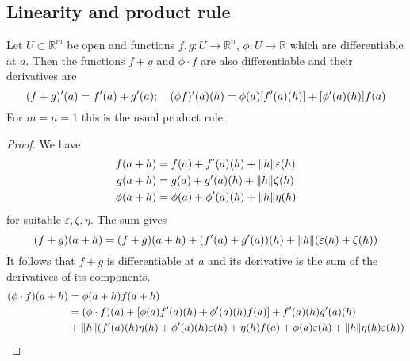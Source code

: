 \subsection{Linearity and product rule}
\begin{proposition}
	Let \( U \subset \mathbb R^m \) be open and functions \( f,g \colon U \to \mathbb R^n \), \( \phi \colon U \to \mathbb R \) which are differentiable at \( a \).
	Then the functions \( f + g \) and \( \phi \cdot f \) are also differentiable and their derivatives are
	\[
		(f+g)'(a) = f'(a) + g'(a);\quad (\phi f)'(a)(h) = \phi(a)\qty[f'(a)(h)] + \qty[\phi'(a)(h)] f(a)
	\]
	For \( m = n = 1 \) this is the usual product rule.
\end{proposition}
\begin{proof}
	We have
	\begin{align*}
		f(a+h)    & = f(a) + f'(a)(h) + \norm{h}\varepsilon(h) \\
		g(a+h)    & = g(a) + g'(a)(h) + \norm{h} \zeta(h)      \\
		\phi(a+h) & = \phi(a) + \phi'(a)(h) + \norm{h}\eta(h)
	\end{align*}
	for suitable \( \varepsilon, \zeta, \eta \).
	The sum gives
	\[
		(f+g)(a+h) = (f+g)(a+h) + (f'(a) + g'(a))(h) + \norm{h}(\varepsilon(h) + \zeta(h))
	\]
	It follows that \( f+g \) is differentiable at \( a \) and its derivative is the sum of the derivatives of its components.
	\begin{align*}
		(\phi \cdot f)(a+h) & = \phi(a+h) f(a+h)                                                                                                                       \\
		                    & = (\phi \cdot f)(a) + \qty[\phi(a) f'(a)(h) + \phi'(a)(h) f(a)] + f'(a)(h) g'(a)(h)                                                      \\
		                    & + \norm{h} \qty(f'(a)(h) \eta(h) + \phi'(a)(h) \varepsilon(h) + \eta(h) f(a) + \phi(a) \varepsilon(h) + \norm{h} \eta(h) \varepsilon(h))
	\end{align*}
\end{proof}
